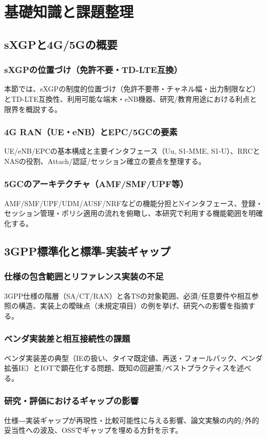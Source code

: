 \chapter{基礎知識と課題整理}
\label{chap:background}

\section{sXGPと4G/5Gの概要}
\subsection{sXGPの位置づけ（免許不要・TD-LTE互換）}
本節では、sXGPの制度的位置づけ（免許不要帯・チャネル幅・出力制限など）とTD-LTE互換性、利用可能な端末・eNB機器、研究/教育用途における利点と限界を概説する。
\subsection{4G RAN（UE・eNB）とEPC/5GCの要素}
UE/eNB/EPCの基本構成と主要インタフェース（Uu, S1-MME, S1-U）、RRCとNASの役割、Attach/認証/セッション確立の要点を整理する。
\subsection{5GCのアーキテクチャ（AMF/SMF/UPF等）}
AMF/SMF/UPF/UDM/AUSF/NRFなどの機能分担とNインタフェース、登録・セッション管理・ポリシ適用の流れを俯瞰し、本研究で利用する機能範囲を明確化する。

\section{3GPP標準化と標準-実装ギャップ}
\subsection{仕様の包含範囲とリファレンス実装の不足}
3GPP仕様の階層（SA/CT/RAN）と各TSの対象範囲、必須/任意要件や相互参照の構造、実装上の曖昧点（未規定項目）の例を挙げ、研究への影響を指摘する。
\subsection{ベンダ実装差と相互接続性の課題}
ベンダ実装差の典型（IEの扱い、タイマ既定値、再送・フォールバック、ベンダ拡張IE）とIOTで顕在化する問題、既知の回避策/ベストプラクティスを述べる。
\subsection{研究・評価におけるギャップの影響}
仕様―実装ギャップが再現性・比較可能性に与える影響、論文実験の内的/外的妥当性への波及、OSSでギャップを埋める方針を示す。

